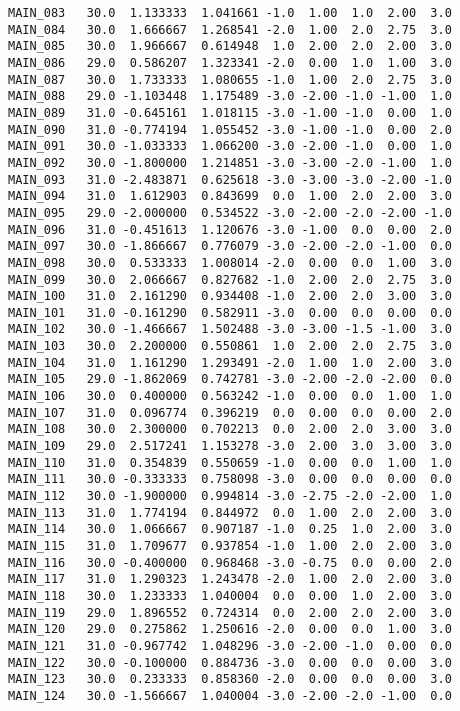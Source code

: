 \documentclass[a4paper,10pt,onecolumn,oneside,openright]{article}
\begin{document}
\begin{verbatim}
MAIN_083   30.0  1.133333  1.041661 -1.0  1.00  1.0  2.00  3.0
MAIN_084   30.0  1.666667  1.268541 -2.0  1.00  2.0  2.75  3.0
MAIN_085   30.0  1.966667  0.614948  1.0  2.00  2.0  2.00  3.0
MAIN_086   29.0  0.586207  1.323341 -2.0  0.00  1.0  1.00  3.0
MAIN_087   30.0  1.733333  1.080655 -1.0  1.00  2.0  2.75  3.0
MAIN_088   29.0 -1.103448  1.175489 -3.0 -2.00 -1.0 -1.00  1.0
MAIN_089   31.0 -0.645161  1.018115 -3.0 -1.00 -1.0  0.00  1.0
MAIN_090   31.0 -0.774194  1.055452 -3.0 -1.00 -1.0  0.00  2.0
MAIN_091   30.0 -1.033333  1.066200 -3.0 -2.00 -1.0  0.00  1.0
MAIN_092   30.0 -1.800000  1.214851 -3.0 -3.00 -2.0 -1.00  1.0
MAIN_093   31.0 -2.483871  0.625618 -3.0 -3.00 -3.0 -2.00 -1.0
MAIN_094   31.0  1.612903  0.843699  0.0  1.00  2.0  2.00  3.0
MAIN_095   29.0 -2.000000  0.534522 -3.0 -2.00 -2.0 -2.00 -1.0
MAIN_096   31.0 -0.451613  1.120676 -3.0 -1.00  0.0  0.00  2.0
MAIN_097   30.0 -1.866667  0.776079 -3.0 -2.00 -2.0 -1.00  0.0
MAIN_098   30.0  0.533333  1.008014 -2.0  0.00  0.0  1.00  3.0
MAIN_099   30.0  2.066667  0.827682 -1.0  2.00  2.0  2.75  3.0
MAIN_100   31.0  2.161290  0.934408 -1.0  2.00  2.0  3.00  3.0
MAIN_101   31.0 -0.161290  0.582911 -3.0  0.00  0.0  0.00  0.0
MAIN_102   30.0 -1.466667  1.502488 -3.0 -3.00 -1.5 -1.00  3.0
MAIN_103   30.0  2.200000  0.550861  1.0  2.00  2.0  2.75  3.0
MAIN_104   31.0  1.161290  1.293491 -2.0  1.00  1.0  2.00  3.0
MAIN_105   29.0 -1.862069  0.742781 -3.0 -2.00 -2.0 -2.00  0.0
MAIN_106   30.0  0.400000  0.563242 -1.0  0.00  0.0  1.00  1.0
MAIN_107   31.0  0.096774  0.396219  0.0  0.00  0.0  0.00  2.0
MAIN_108   30.0  2.300000  0.702213  0.0  2.00  2.0  3.00  3.0
MAIN_109   29.0  2.517241  1.153278 -3.0  2.00  3.0  3.00  3.0
MAIN_110   31.0  0.354839  0.550659 -1.0  0.00  0.0  1.00  1.0
MAIN_111   30.0 -0.333333  0.758098 -3.0  0.00  0.0  0.00  0.0
MAIN_112   30.0 -1.900000  0.994814 -3.0 -2.75 -2.0 -2.00  1.0
MAIN_113   31.0  1.774194  0.844972  0.0  1.00  2.0  2.00  3.0
MAIN_114   30.0  1.066667  0.907187 -1.0  0.25  1.0  2.00  3.0
MAIN_115   31.0  1.709677  0.937854 -1.0  1.00  2.0  2.00  3.0
MAIN_116   30.0 -0.400000  0.968468 -3.0 -0.75  0.0  0.00  2.0
MAIN_117   31.0  1.290323  1.243478 -2.0  1.00  2.0  2.00  3.0
MAIN_118   30.0  1.233333  1.040004  0.0  0.00  1.0  2.00  3.0
MAIN_119   29.0  1.896552  0.724314  0.0  2.00  2.0  2.00  3.0
MAIN_120   29.0  0.275862  1.250616 -2.0  0.00  0.0  1.00  3.0
MAIN_121   31.0 -0.967742  1.048296 -3.0 -2.00 -1.0  0.00  0.0
MAIN_122   30.0 -0.100000  0.884736 -3.0  0.00  0.0  0.00  3.0
MAIN_123   30.0  0.233333  0.858360 -2.0  0.00  0.0  0.00  3.0
MAIN_124   30.0 -1.566667  1.040004 -3.0 -2.00 -2.0 -1.00  0.0

\end{verbatim}
\end{document}
